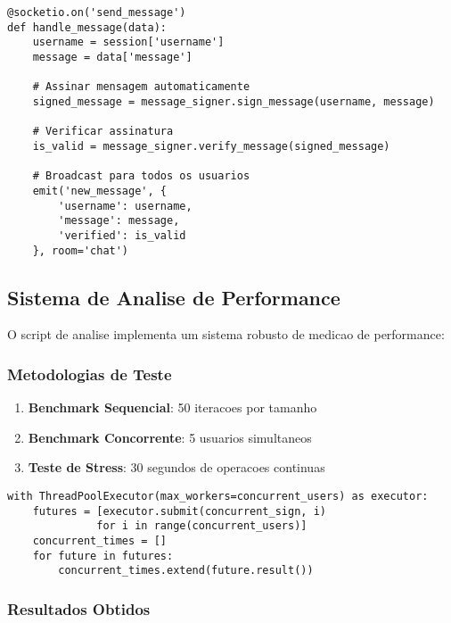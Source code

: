 \documentclass[12pt,a4paper,oneside]{article}
\begin{document}
\begin{lstlisting}[caption=Processamento de mensagem no chat]
@socketio.on('send_message')
def handle_message(data):
    username = session['username']
    message = data['message']
    
    # Assinar mensagem automaticamente
    signed_message = message_signer.sign_message(username, message)
    
    # Verificar assinatura
    is_valid = message_signer.verify_message(signed_message)
    
    # Broadcast para todos os usuarios
    emit('new_message', {
        'username': username,
        'message': message,
        'verified': is_valid
    }, room='chat')
\end{lstlisting}

\subsection{Sistema de Analise de Performance}

O script de analise implementa um sistema robusto de medicao de performance:

\subsubsection{Metodologias de Teste}

\begin{enumerate}
    \item \textbf{Benchmark Sequencial}: 50 iteracoes por tamanho
    \item \textbf{Benchmark Concorrente}: 5 usuarios simultaneos
    \item \textbf{Teste de Stress}: 30 segundos de operacoes continuas
\end{enumerate}

\begin{lstlisting}[caption=Implementacao do teste concorrente]
with ThreadPoolExecutor(max_workers=concurrent_users) as executor:
    futures = [executor.submit(concurrent_sign, i) 
              for i in range(concurrent_users)]
    concurrent_times = []
    for future in futures:
        concurrent_times.extend(future.result())
\end{lstlisting}

\subsubsection{Resultados Obtidos}
\end{document}
